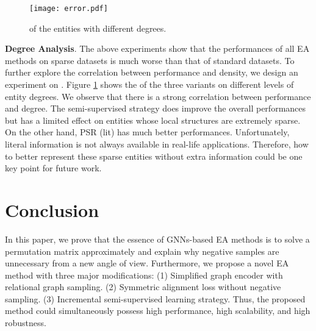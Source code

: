 \documentclass[sigconf]{acmart}
\begin{document}
\begin{figure}
  \centering
  \texttt{[image: error.pdf]}
  \caption{ of the entities with different degrees.}\label{Figure:error}
\end{figure}

\noindent
\textbf{Degree Analysis}.
The above experiments show that the performances of all EA methods on sparse datasets is much worse than that of standard datasets.
To further explore the correlation between performance and density, we design an experiment on .
Figure \ref{Figure:error} shows the  of the three variants on different levels of entity degrees.
We observe that there is a strong correlation between performance and degree.
The semi-supervised strategy does improve the overall performances but has a limited effect on entities whose local structures are extremely sparse.
On the other hand, PSR (lit) has much better performances.
Unfortunately, literal information is not always available in real-life applications.
Therefore, how to better represent these sparse entities without extra information could be one key point for future work.

\section{Conclusion}
In this paper, we prove that the essence of GNNs-based EA methods is to solve a permutation matrix approximately and explain why negative samples are
unnecessary from a new angle of view.
Furthermore, we propose a novel EA method with three major modifications: (1) Simplified graph encoder with relational graph sampling. (2) Symmetric alignment loss without negative sampling. (3) Incremental semi-supervised learning strategy. 
Thus, the proposed method could simultaneously possess high performance, high scalability, and high robustness.


\end{document}
